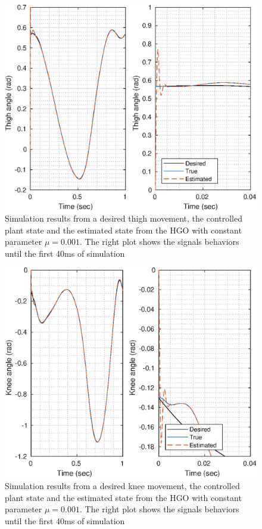 \documentclass[letterpaper, 10 pt, journal, twocolumn]{IEEEtran}  %
\theoremstyle{plain}
\theoremstyle{definition}
\theoremstyle{remark}
\begin{document}
\begin{figure}[h!]
	\begin{center}
	\includegraphics[width = \columnwidth]{Figs/q_thigh_mu_1e-03.eps}
	\caption{ Simulation results from a desired thigh movement, the controlled plant state and the estimated state from the HGO with constant parameter $\mu=0.001$. The right plot shows the signals behaviors until the first 40ms of simulation}
	\label{fig:thigh}
	\end{center}
\end{figure}
%
%
\begin{figure}[h!]
	\begin{center}
	\includegraphics[width = \columnwidth]{Figs/q_knee_mu_1e-03.eps}
	\caption{ Simulation results from a desired knee movement, the controlled plant state and the estimated state from the HGO with constant parameter $\mu=0.001$. The right plot shows the signals behaviors until the first 40ms of simulation}
	\label{fig:knee}
	\end{center}
\end{figure}
\end{document}
